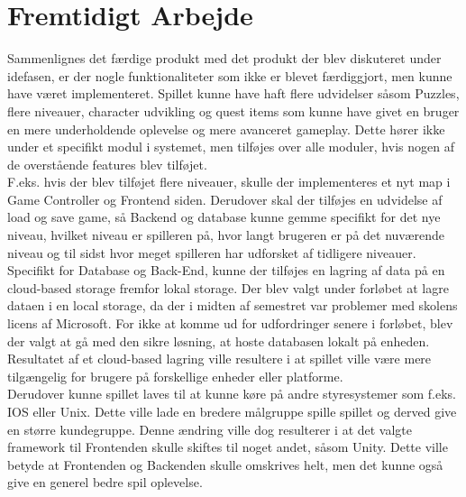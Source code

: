 \section{Fremtidigt Arbejde}
Sammenlignes det færdige produkt med det produkt der blev diskuteret under idefasen, er der nogle funktionaliteter som ikke er blevet færdiggjort, men kunne have været implementeret. Spillet kunne have haft flere udvidelser såsom Puzzles, flere niveauer, character udvikling og quest items som kunne have givet en bruger en mere underholdende oplevelse og mere avanceret gameplay. Dette hører ikke under et specifikt modul i systemet, men tilføjes over alle moduler, hvis nogen af de overstående features blev tilføjet. \\

\noindent F.eks. hvis der blev tilføjet flere niveauer, skulle der implementeres et nyt map i Game Controller og Frontend siden. Derudover skal der tilføjes en udvidelse af load og save game, så Backend og database kunne gemme specifikt for det nye niveau, hvilket niveau er spilleren på, hvor langt brugeren er på det nuværende niveau og til sidst hvor meget spilleren har udforsket af tidligere niveauer.\\

\noindent Specifikt for Database og Back-End, kunne der tilføjes en lagring af data på en cloud-based storage fremfor lokal storage. Der blev valgt under forløbet at lagre dataen i en local storage, da der i midten af semestret var problemer med skolens licens af Microsoft. For ikke at komme ud for udfordringer senere i forløbet, blev der valgt at gå med den sikre løsning, at hoste databasen lokalt på enheden. Resultatet af et cloud-based lagring ville resultere i at spillet ville være mere tilgængelig for brugere på forskellige enheder eller platforme. \\

\noindent Derudover kunne spillet laves til at kunne køre på andre styresystemer som f.eks. IOS eller Unix. Dette ville lade en bredere målgruppe spille spillet og derved give en større kundegruppe. Denne ændring ville dog resulterer i at det valgte framework til Frontenden skulle skiftes til noget andet, såsom Unity. Dette ville betyde at Frontenden og Backenden skulle omskrives helt, men det kunne også give en generel bedre spil oplevelse.


